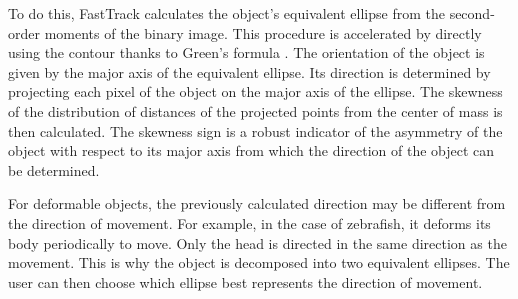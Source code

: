		To do this, FastTrack calculates the object's equivalent ellipse from the second-order moments of the binary image. This procedure is accelerated by directly using the contour thanks to Green's formula \cite{}. The orientation of the object is given by the major axis of the equivalent ellipse. Its direction is determined by projecting each pixel of the object on the major axis of the ellipse. The skewness of the distribution of distances of the projected points from the center of mass is then calculated. The skewness sign is a robust indicator of the asymmetry of the object with respect to its major axis from which the direction of the object can be determined.

		For deformable objects, the previously calculated direction may be different from the direction of movement. For example, in the case of zebrafish, it deforms its body periodically to move. Only the head is directed in the same direction as the movement. This is why the object is decomposed into two equivalent ellipses. The user can then choose which ellipse best represents the direction of movement.

